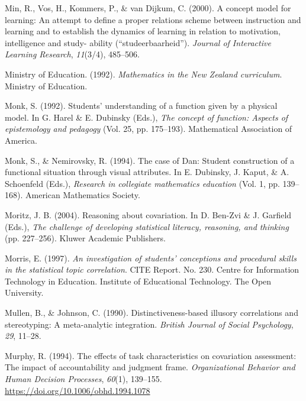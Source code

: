 \documentclass[11pt]{umnthesis}
\newlength{\cslhangindent}
\newenvironment{CSLReferences}[2] %
 {%
  \setlength{\parindent}{0pt}
  \ifodd #1 \everypar{\setlength{\hangindent}{\cslhangindent}}\ignorespaces\fi
  \ifnum #2 > 0
  \setlength{\parskip}{#2\baselineskip}
  \fi
 }%
 {}
\begin{document}
\begin{CSLReferences}{1}{0}
\leavevmode{}%
Min, R., Vos, H., Kommers, P., \& van Dijkum, C. (2000). A concept model for learning: An attempt to define a proper relations scheme between instruction and learning and to establish the dynamics of learning in relation to motivation, intelligence and study- ability ({``studeerbaarheid''}). \emph{Journal of Interactive Learning Research}, \emph{11}(3/4), 485--506.

\leavevmode{}%
Ministry of Education. (1992). \emph{Mathematics in the {N}ew {Z}ealand curriculum}. Ministry of Education.

\leavevmode{}%
Monk, S. (1992). Students' understanding of a function given by a physical model. In G. Harel \& E. Dubinsky (Eds.), \emph{The concept of function: Aspects of epistemology and pedagogy} (Vol. 25, pp. 175--193). Mathematical Association of America.

\leavevmode{}%
Monk, S., \& Nemirovsky, R. (1994). The case of {D}an: Student construction of a functional situation through visual attributes. In E. Dubinsky, J. Kaput, \& A. Schoenfeld (Eds.), \emph{Research in collegiate mathematics education} (Vol. 1, pp. 139--168). American Mathematics Society.

\leavevmode{}%
Moritz, J. B. (2004). Reasoning about covariation. In D. Ben-Zvi \& J. Garfield (Eds.), \emph{The challenge of developing statistical literacy, reasoning, and thinking} (pp. 227--256). Kluwer Academic Publishers.

\leavevmode{}%
Morris, E. (1997). \emph{An investigation of students' conceptions and procedural skills in the statistical topic correlation}. {CITE Report. No. 230. Centre for Information Technology in Education. Institute of Educational Technology. The Open University}.

\leavevmode{}%
Mullen, B., \& Johnson, C. (1990). Distinctiveness-based illusory correlations and stereotyping: A meta-analytic integration. \emph{British Journal of Social Psychology}, \emph{29}, 11--28.

\leavevmode{}%
Murphy, R. (1994). The effects of task characteristics on covariation assessment: The impact of accountability and judgment frame. \emph{Organizational Behavior and Human Decision Processes}, \emph{60}(1), 139--155. \url{https://doi.org/10.1006/obhd.1994.1078}


\end{CSLReferences}
\end{document}
